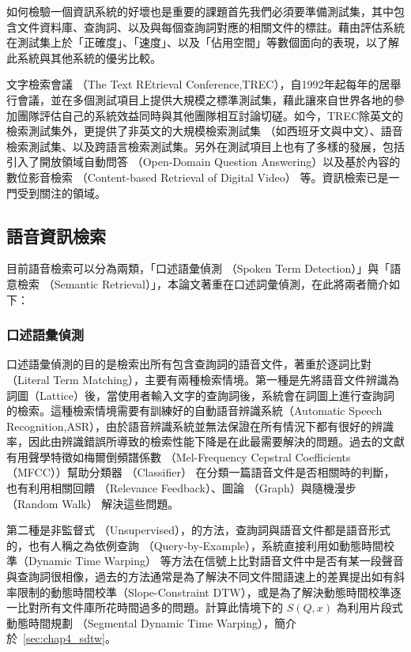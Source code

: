 如何檢驗一個資訊系統的好壞也是重要的課題首先我們必須要準備測試集，其中包含文件資料庫、查詢詞、以及與每個查詢詞對應的相關文件的標註。藉由評估系統在測試集上於「正確度」、「速度」、以及「佔用空間」等數個面向的表現，以了解此系統與其他系統的優劣比較。

文字檢索會議 （The Text REtrieval Conference,TREC），自1992年起每年的居舉行會議，並在多個測試項目上提供大規模之標準測試集，藉此讓來自世界各地的參加團隊評估自己的系統效益同時與其他團隊相互討論切磋。如今，TREC除英文的檢索測試集外，更提供了非英文的大規模檢索測試集
（如西班牙文與中文）、語音檢索測試集、以及跨語言檢索測試集。另外在測試項目上也有了多樣的發展，包括引入了開放領域自動問答
（Open-Domain Question Answering）以及基於內容的數位影音檢索
（Content-based Retrieval of Digital Video）
等。資訊檢索已是一門受到關注的領域。



\subsection{語音資訊檢索}
目前語音檢索可以分為兩類，「口述語彙偵測 （Spoken Term
Detection）」與「語意檢索 （Semantic
Retrieval）」，本論文著重在口述詞彙偵測，在此將兩者簡介如下：

\subsubsection{口述語彙偵測}


口述語彙偵測的目的是檢索出所有包含查詢詞的語音文件，著重於逐詞比對（Literal
Term
Matching），主要有兩種檢索情境。第一種是先將語音文件辨識為詞圖（Lattice）後，當使用者輸入文字的查詢詞後，系統會在詞圖上進行查詢詞的檢索。這種檢索情境需要有訓練好的自動語音辨識系統（Automatic Speech Recognition,ASR），由於語音辨識系統並無法保證在所有情況下都有很好的辨識率，因此由辨識錯誤所導致的檢索性能下降是在此最需要解決的問題。過去的文獻有用聲學特徵如梅爾倒頻譜係數
（Mel-Frequency Cepstral Coefficients （MFCC））幫助分類器 （Classifier）
在分類一篇語音文件是否相關時的判斷，也有利用相關回饋 （Relevance Feedback）、圖論 （Graph）與隨機漫步 （Random Walk）
解決這些問題。

第二種是非監督式
（Unsupervised），的方法，查詢詞與語音文件都是語音形式的，也有人稱之為依例查詢
（Query-by-Example），系統直接利用如動態時間校準（Dynamic Time Warping）
等方法在信號上比對語音文件中是否有某一段聲音與查詢詞很相像，過去的方法通常是為了解決不同文件間語速上的差異提出如有斜率限制的動態時間校準（Slope-Constraint
DTW），或是為了解決動態時間校準逐一比對所有文件庫所花時間過多的問題。計算此情境下的
 $ S(Q, x) $  為利用片段式動態時間規劃 （Segmental Dynamic Time Warping），簡介於~\ref{sec:chap4_sdtw}。

